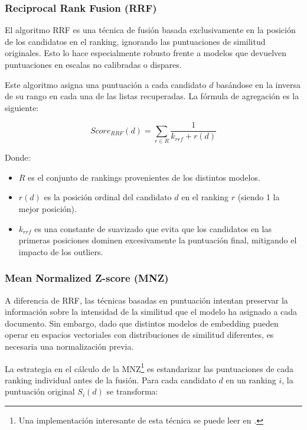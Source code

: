 \subsubsection{Reciprocal Rank Fusion (RRF)}

\noindent El algoritmo \gls{RRF} \cite{cormack2009reciprocal} es una técnica de fusión basada exclusivamente en la posición de los candidatos en el ranking, ignorando las puntuaciones de similitud originales. Esto lo hace especialmente robusto frente a modelos que devuelven puntuaciones en escalas no calibradas o dispares.

Este algoritmo asigna una puntuación a cada candidato $d$ basándose en la inversa de su rango en cada una de las listas recuperadas. La fórmula de agregación es la siguiente:

\begin{equation}
    Score_{RRF}(d) = \sum_{r \in R} \frac{1}{k_{rrf} + r(d)}
\end{equation}

Donde:
\begin{itemize}
    \item $R$ es el conjunto de rankings provenientes de los distintos modelos.
    \item $r(d)$ es la posición ordinal del candidato $d$ en el ranking $r$ (siendo 1 la mejor posición).
    \item $k_{rrf}$ es una constante de suavizado que evita que los candidatos en las primeras posiciones dominen excesivamente la puntuación final, mitigando el impacto de los outliers.
\end{itemize}

\subsubsection{Mean Normalized Z-score (MNZ)}

\noindent A diferencia de \gls{RRF}, las técnicas basadas en puntuación intentan preservar la información sobre la intensidad de la similitud que el modelo ha asignado a cada documento. Sin embargo, dado que distintos modelos de embedding pueden operar en espacios vectoriales con distribuciones de similitud diferentes, es necesaria una normalización previa.

La estrategia en el cálculo de la \gls{MNZ}\footnote{Una implementación interesante de esta técnica se puede leer en \cite{wu2006evaluating}.} es estandarizar las puntuaciones de cada ranking individual antes de la fusión. Para cada candidato $d$ en un ranking $i$, la puntuación original $S_{i}(d)$ se transforma:

